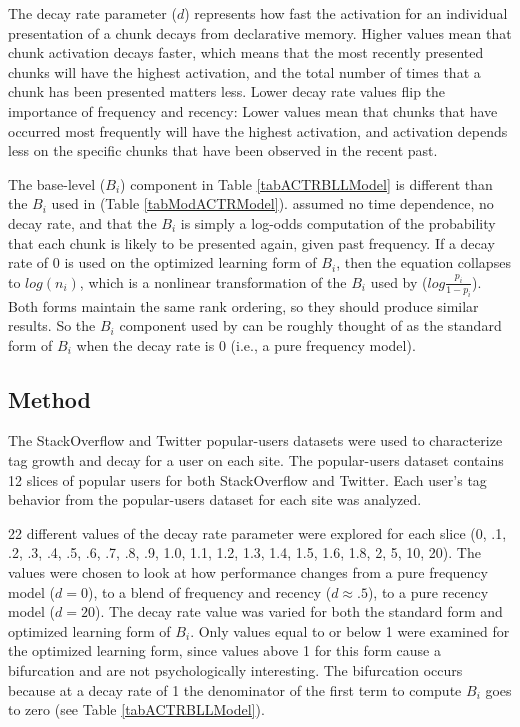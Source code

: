 \documentclass[man,floatsintext,donotrepeattitle]{apa6}
\begin{document}
The decay rate parameter ($d$) represents how fast the activation for an individual presentation of a chunk decays from declarative memory.
Higher values mean that chunk activation decays faster, which means that the most recently presented chunks will have the highest activation, and the total number of times that a chunk has been presented matters less.
Lower decay rate values flip the importance of frequency and recency:
Lower values mean that chunks that have occurred most frequently will have the highest activation,
and activation depends less on the specific chunks that have been observed in the recent past.

The base-level ($B_{i}$) component in Table \ref{tabACTRBLLModel} is different than the $B_{i}$ used in \textcite{Stanley2013} (Table \ref{tabModACTRModel}).
\citeauthor{Stanley2013} assumed no time dependence, no decay rate, and that the $B_{i}$ is simply a log-odds computation of the probability that each chunk is likely to be presented again, given past frequency.
If a decay rate of 0 is used on the optimized learning form of $B_{i}$, then the equation collapses to $log \left ( n_{i} \right )$,
which is a nonlinear transformation of the $B_{i}$ used by \citeauthor{Stanley2013} ($log \frac{p_{i}}{1-p_{i}}$).
Both forms maintain the same rank ordering, so they should produce similar results.
So the $B_{i}$ component used by \citeauthor{Stanley2013} can be roughly thought of as the standard form of $B_{i}$ when the decay rate is 0 (i.e., a pure frequency model).

\subsection{Method}

The StackOverflow and Twitter popular-users datasets were used to characterize tag growth and decay for a user on each site.
The popular-users dataset contains 12 slices of popular users for both StackOverflow and Twitter.
Each user's tag behavior from the popular-users dataset for each site was analyzed. 

22 different values of the decay rate parameter were explored for each slice
(0, .1, .2, .3, .4, .5, .6, .7, .8, .9, 1.0, 1.1, 1.2, 1.3, 1.4, 1.5, 1.6, 1.8, 2, 5, 10, 20).
The values were chosen to look at how performance changes from a pure frequency model ($d=0$), to a blend of frequency and recency ($d \approx .5$), to a pure recency model ($d=20$).
The decay rate value was varied for both the standard form and optimized learning form of $B_{i}$. 
Only values equal to or below 1 were examined for the optimized learning form, since values above 1 for this form cause a bifurcation and are not psychologically interesting.
The bifurcation occurs because at a decay rate of 1 the denominator of the first term to compute $B_{i}$ goes to zero (see Table \ref{tabACTRBLLModel}).
\end{document}
